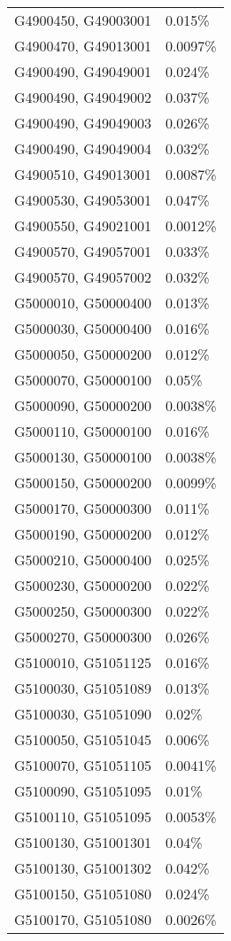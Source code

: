 \begin{longtable}[]{@{}ll@{}}
G4900450, G49003001 & 0.015\% \\
G4900470, G49013001 & 0.0097\% \\
G4900490, G49049001 & 0.024\% \\
G4900490, G49049002 & 0.037\% \\
G4900490, G49049003 & 0.026\% \\
G4900490, G49049004 & 0.032\% \\
G4900510, G49013001 & 0.0087\% \\
G4900530, G49053001 & 0.047\% \\
G4900550, G49021001 & 0.0012\% \\
G4900570, G49057001 & 0.033\% \\
G4900570, G49057002 & 0.032\% \\
G5000010, G50000400 & 0.013\% \\
G5000030, G50000400 & 0.016\% \\
G5000050, G50000200 & 0.012\% \\
G5000070, G50000100 & 0.05\% \\
G5000090, G50000200 & 0.0038\% \\
G5000110, G50000100 & 0.016\% \\
G5000130, G50000100 & 0.0038\% \\
G5000150, G50000200 & 0.0099\% \\
G5000170, G50000300 & 0.011\% \\
G5000190, G50000200 & 0.012\% \\
G5000210, G50000400 & 0.025\% \\
G5000230, G50000200 & 0.022\% \\
G5000250, G50000300 & 0.022\% \\
G5000270, G50000300 & 0.026\% \\
G5100010, G51051125 & 0.016\% \\
G5100030, G51051089 & 0.013\% \\
G5100030, G51051090 & 0.02\% \\
G5100050, G51051045 & 0.006\% \\
G5100070, G51051105 & 0.0041\% \\
G5100090, G51051095 & 0.01\% \\
G5100110, G51051095 & 0.0053\% \\
G5100130, G51001301 & 0.04\% \\
G5100130, G51001302 & 0.042\% \\
G5100150, G51051080 & 0.024\% \\
G5100170, G51051080 & 0.0026\% \\

\end{longtable}

